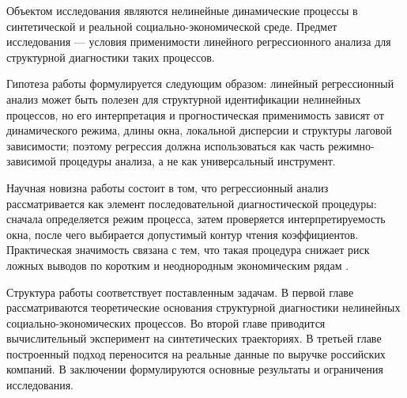 Объектом исследования являются нелинейные динамические процессы в синтетической и реальной социально-экономической среде. Предмет исследования --- условия применимости линейного регрессионного анализа для структурной диагностики таких процессов.

Гипотеза работы формулируется следующим образом: линейный регрессионный анализ может быть полезен для структурной идентификации нелинейных процессов, но его интерпретация и прогностическая применимость зависят от динамического режима, длины окна, локальной дисперсии и структуры лаговой зависимости; поэтому регрессия должна использоваться как часть режимно-зависимой процедуры анализа, а не как универсальный инструмент.

Научная новизна работы состоит в том, что регрессионный анализ рассматривается как элемент последовательной диагностической процедуры: сначала определяется режим процесса, затем проверяется интерпретируемость окна, после чего выбирается допустимый контур чтения коэффициентов. Практическая значимость связана с тем, что такая процедура снижает риск ложных выводов по коротким и неоднородным экономическим рядам \cite{montgomery,wooldridge}.

Структура работы соответствует поставленным задачам. В первой главе рассматриваются теоретические основания структурной диагностики нелинейных социально-экономических процессов. Во второй главе приводится вычислительный эксперимент на синтетических траекториях. В третьей главе построенный подход переносится на реальные данные по выручке российских компаний. В заключении формулируются основные результаты и ограничения исследования.
